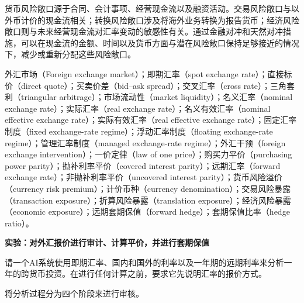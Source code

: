 货币风险敞口源于合同、会计事项、经营现金流以及融资活动。交易风险敞口与以外币计价的现金流相关；转换风险敞口涉及将海外业务转换为报告货币；经济风险敞口则与未来经营现金流对汇率变动的敏感性有关。通过金融对冲和天然对冲措施，可以在现金流的金额、时间以及货币方面与潜在风险敞口保持足够接近的情况下，减少或重新分配这些风险敞口。




外汇市场（Foreign exchange market）；即期汇率（spot exchange rate）；直接标价（direct quote）；买卖价差（bid--ask spread）；交叉汇率（cross rate）；三角套利（triangular arbitrage）；市场流动性（market liquidity）；名义汇率（nominal exchange rate）；实际汇率（real exchange rate）；名义有效汇率（nominal effective exchange rate）；实际有效汇率（real effective exchange rate）；固定汇率制度（fixed exchange-rate regime）；浮动汇率制度（floating exchange-rate regime）；管理汇率制度（managed exchange-rate regime）；外汇干预（foreign exchange intervention）；一价定律（law of one price）；购买力平价（purchasing power parity）；抛补利率平价（covered interest parity）；远期汇率（forward exchange rate）；非抛补利率平价（uncovered interest parity）；货币风险溢价（currency risk premium）；计价币种（currency denomination）；交易风险暴露（transaction exposure）；折算风险暴露（translation exposure）；经济风险暴露（economic exposure）；远期套期保值（forward hedge）；套期保值比率（hedge ratio）。



\textbf{实验：对外汇报价进行审计、计算平价，并进行套期保值}

请一个AI系统使用即期汇率、国内和国外的利率以及一年期的远期利率来分析一年的跨货币投资。在进行任何计算之前，要求它先说明汇率的报价方式。

将分析过程分为四个阶段来进行审核。

